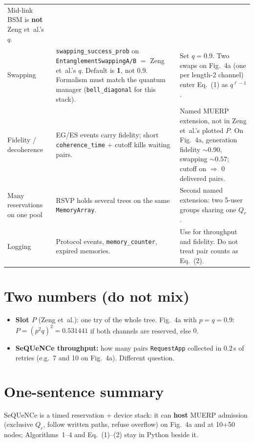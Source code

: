 \documentclass[11pt]{article}
\begin{document}
{\begin{center}
\begin{tabularx}{\textwidth}{@{}P{1.25in} Y Y@{}}
    Mid-link BSM is \textbf{not} Zeng et~al.'s $q$. \\
Swapping
  & \texttt{swapping\_success\_prob} on \texttt{EntanglementSwappingA/B} $=$ Zeng et~al.'s $q$.
    Default is \textbf{1}, not $0.9$.
    Formalism must match the quantum manager (\texttt{bell\_diagonal} for this stack).
  & Set $q=0.9$.
    Two swaps on Fig.~4a (one per length-2 channel) enter Eq.~(1) as $q^{\ell-1}$. \\
Fidelity / decoherence
  & EG/ES events carry fidelity; short \texttt{coherence\_time} + cutoff kills waiting pairs.
  & Named MUERP extension, not in Zeng et~al.'s plotted $P$.
    On Fig.~4a, generation fidelity $\sim 0.90$, swapping $\sim 0.57$; cutoff on $\Rightarrow$ 0 delivered pairs. \\
Many reservations on one pool
  & RSVP holds several trees on the same \texttt{MemoryArray}.
  & Second named extension: two 5-user groups sharing one $Q_r$. \\
Logging
  & Protocol events, \texttt{memory\_counter}, expired memories.
  & Use for throughput and fidelity.
    Do not treat pair counts as Eq.~(2). \\
\bottomrule
\end{tabularx}
\end{center}}

\section{Two numbers (do not mix)}

\begin{itemize}
\item \textbf{Slot $P$} (Zeng et~al.): one try of the whole tree.
Fig.~4a with $p=q=0.9$: $P=(p^2 q)^2=0.531441$ if both channels are reserved, else $0$.
\item \textbf{SeQUeNCe throughput:} how many pairs \texttt{RequestApp} collected in $0.2$\,s of retries (e.g.\ 7 and 10 on Fig.~4a).
Different question.
\end{itemize}

\section{One-sentence summary}

SeQUeNCe is a timed reservation + device stack: it can \textbf{host} MUERP admission (exclusive $Q_r$, follow written paths, refuse overflow) on Fig.~4a and at 10+50 nodes; Algorithms~1--4 and Eq.~(1)--(2) stay in Python beside it.
\end{document}
